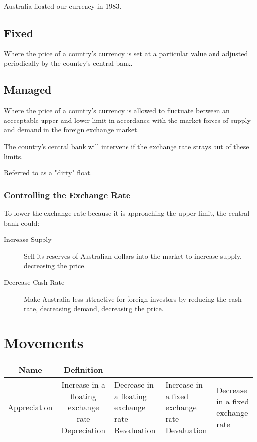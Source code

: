 \documentclass[a4paper,11pt]{article}
\begin{document}
Australia floated our currency in 1983.


\subsection{Fixed}

Where the price of a country's currency is set at a particular value and
adjusted periodically by the country's central bank.


\subsection{Managed}

Where the price of a country's currency is allowed to fluctuate between an
accceptable upper and lower limit in accordance with the market forces of
supply and demand in the foreign exchange market.

The country's central bank will intervene if the exchange rate strays out of
these limits.

Referred to as a "dirty" float.


\subsubsection{Controlling the Exchange Rate}

To lower the exchange rate because it is approaching the upper limit, the
central bank could:

\begin{description}
\item [Increase Supply] Sell its reserves of Australian dollars into the market
	to increase supply, decreasing the price.
\item [Decrease Cash Rate] Make Australia less attractive for foreign
	investors by reducing the cash rate, decreasing demand, decreasing the
	price.
\end{description}




\section{Movements}

\begin{center}
\begin{tabular}{c|c}
Name & Definition \\
\hline
Appreciation & Increase in a floating exchange rate
Depreciation & Decrease in a floating exchange rate
Revaluation & Increase in a fixed exchange rate
Devaluation & Decrease in a fixed exchange rate
\end{tabular}
\end{center}
\end{document}
